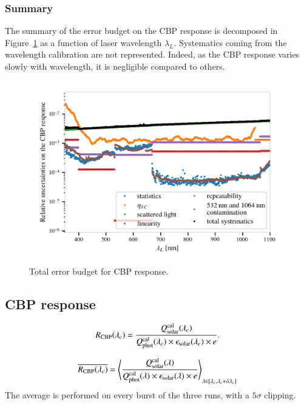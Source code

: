 \subsubsection{Summary}\label{sec:cbp_summary}

The summary of the error budget on the CBP response is decomposed in Figure~\ref{fig:cbp_budget} as a function of laser wavelength $\lambda_L$. Systematics coming from the wavelength calibration are not represented. Indeed, as the CBP response varies slowly with wavelength, it is negligible compared to others. 

\begin{figure}[h]
    \centering
    \includegraphics[width=\columnwidth]{fig/cbp_error_budget.png}
    \caption{Total error budget for CBP response.}
    \label{fig:cbp_budget}
\end{figure}

\subsection{CBP response}


\begin{equation}
    R_{\mathrm{CBP}}(\lambda_c) = \frac{Q_{\mathrm{solar}}^{\rm cal}(\lambda_c)}{Q_{\mathrm{phot}}^{\rm cal}(\lambda_c) \times \epsilon_{\mathrm{solar}}(\lambda_c) \times e}.
    \label{eq:rcbp2}
\end{equation} 

\begin{equation}
    \overline{R_{\mathrm{CBP}}(\lambda_c)} = \left\langle\frac{Q_{\mathrm{solar}}^{\rm cal}(\lambda)}{Q_{\mathrm{phot}}^{\rm cal}(\lambda) \times \epsilon_{\mathrm{solar}}(\lambda) \times e}\right\rangle_{\lambda\in [\lambda_c,\lambda_c+\delta \lambda_c]}
    \label{eq:rcbp3}
\end{equation} 
The average is performed on every burst of the three runs, with a $5\sigma$ clipping.


